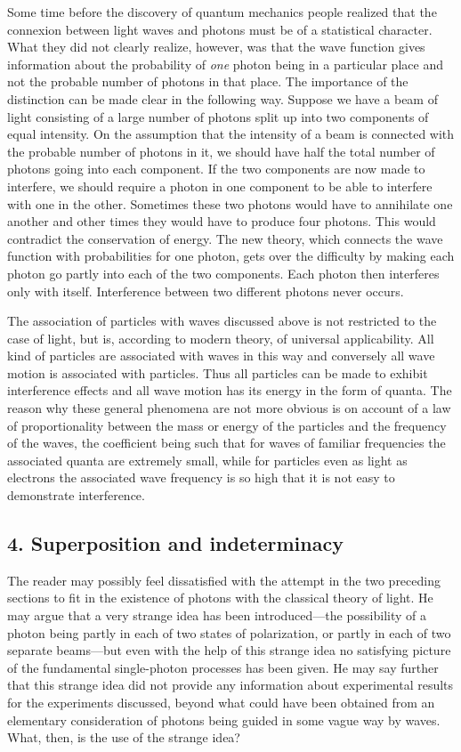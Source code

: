 Some time before the discovery of quantum mechanics people realized that the connexion between light waves and photons must be of a statistical character.  What they did not clearly realize, however, was that the wave function gives information about the probability of \emph{one} photon being in a particular place and not the probable number of photons in that place.  The importance of the distinction can be made clear in the following way.  Suppose we have a beam of light consisting of a large number of photons split up into two components of equal intensity.  On the assumption that the intensity of a beam is connected with the probable number of photons in it, we should have half the total number of photons going into each component.  If the two components are now made to interfere, we should require a photon in one component to be able to interfere with one in the other.  Sometimes these two photons would have to annihilate one another and other times they would have to produce four photons.  This would contradict the conservation of energy.  The new theory, which connects the wave function with probabilities for one photon, gets over the difficulty by making each photon go partly into each of the two components.  Each photon then interferes only with itself.  Interference between two different photons never occurs.

\label{s:dirac_partwave} The association of particles with waves discussed above is not restricted to the case of light, but is, according to modern theory, of universal applicability.  All kind of particles are associated with waves in this way and conversely all wave motion is associated with particles.  Thus all particles can be made to exhibit interference effects and all wave motion has its energy in the form of quanta.  The reason why these general phenomena are not more obvious is on account of a law of proportionality between the mass or energy of the particles and the frequency of the waves, the coefficient being such that for waves of familiar frequencies the associated quanta are extremely small, while for particles even as light as electrons the associated wave frequency is so high that it is not easy to demonstrate interference.

\subsection{4. Superposition and indeterminacy}

The reader may possibly feel dissatisfied with the attempt in the two preceding sections to fit in the existence of photons with the classical theory of light.  He may argue that a very strange idea has been introduced---the possibility of a photon being partly in each of two states of polarization, or partly in each of two separate beams---but even with the help of this strange idea no satisfying picture of the fundamental single-photon processes has been given.  He may say further that this strange idea did not provide any information about experimental results for the experiments discussed, beyond what could have been obtained from an elementary consideration of photons being guided in some vague way by waves.  What, then, is the use of the strange idea?

